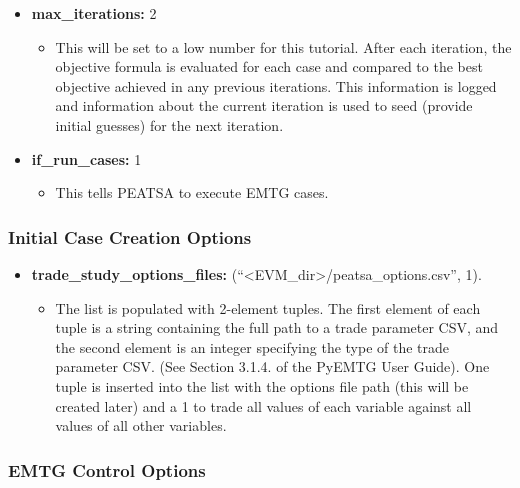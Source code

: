 \documentclass[11pt]{article}
\begin{document}
\begin{itemize}
	\item\textbf{max\_iterations:} 2
	\begin{itemize}
		\item This will be set to a low number for this tutorial. After each iteration, the objective formula is evaluated for each case and compared to the best objective achieved in any previous iterations. This information is logged and information about the current iteration is used to seed (provide initial guesses) for the next iteration.
	\end{itemize}
	\item\textbf{if\_run\_cases:} 1
	\begin{itemize}
		\item This tells \ac{PEATSA} to execute \ac{EMTG} cases.
	\end{itemize}
\end{itemize}

\subsubsection{Initial Case Creation Options}
\label{sec:initial_case_creation_options}

\begin{itemize}
	\item\textbf{trade\_study\_options\_files:} (``\textless EVM\_dir\textgreater/peatsa\_options.csv'', 1). 
	\begin{itemize}
		\item The list is populated with 2-element tuples. The first element of each tuple is a string containing the full path to a trade parameter CSV, and the second element is an integer specifying the type of the trade parameter CSV. (See Section 3.1.4. of the PyEMTG User Guide). One tuple is inserted into the list with the options file path (this will be created later) and a 1 to trade all values of each variable against all values of all other variables.
	\end{itemize}
\end{itemize}

\subsubsection{EMTG Control Options}
\label{sec:emtg_control_options}
\end{document}
